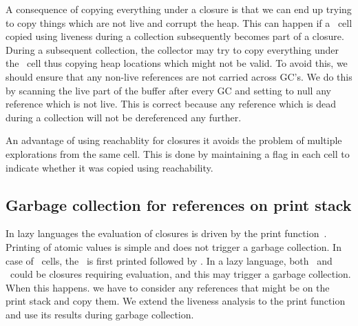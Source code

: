 \documentclass[9pt]{sigplanconf}
\begin{document}
A consequence of copying everything under a closure is that we can end
up trying to copy things which are not live and corrupt the heap. This
can happen if a \CONS\  cell copied using liveness during a collection
subsequently  becomes   part  of  a  closure.    During  a  subsequent
collection,  the  collector  may  try  to copy  everything  under  the
\CONS\ cell thus copying heap  locations which might not be valid.  To
avoid  this, we  should ensure  that any  non-live references  are not
carried across  GC's.  We  do this  by scanning the  live part  of the
buffer after every  GC and setting to null any  reference which is not
live. This  is correct  because any reference  which is dead  during a
collection will not be dereferenced any further.


An advantage of  using reachablity for closures it  avoids the problem
of  multiple  explorations  from  the  same  cell.  This  is  done  by
maintaining  a flag in  each cell  to indicate  whether it  was copied
using  reachability. 


\subsection{Garbage collection for references on print stack}
In lazy  languages the evaluation of  closures is driven  by the print
function~\cite{Jones87}.  Printing of  atomic values is
simple  and  does  not  trigger  a garbage  collection.   In  case  of
\CONS\ cells, the \CAR\ is first  printed followed by \CDR.  In a lazy
language, both \CAR\ and \CDR\ could be closures requiring evaluation,
and this  may trigger  a garbage collection.   When this  happens.  we
have to consider  any references that might be on  the print stack and
copy them. We extend the liveness analysis to the print function and
use its results during garbage collection.

\end{document}
